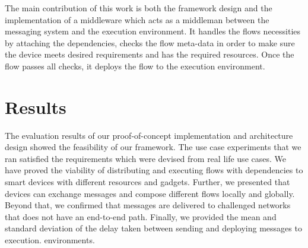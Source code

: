 \noindent The main contribution of this work is both the framework design and the implementation of a middleware which acts as a middleman between the messaging system and the execution environment. It handles the flows necessities by attaching the dependencies, checks the flow meta-data in order to make sure the device meets desired requirements and has the required resources. Once the flow passes all checks, it deploys the flow to the execution environment.


\section{Results}
The evaluation results of our  proof-of-concept implementation and architecture design showed the feasibility of our framework. The use case experiments that we ran satisfied the  requirements which were devised from  real life use cases. We have proved the viability of distributing and executing flows with dependencies to smart devices with different resources and gadgets. Further, we presented that devices can exchange messages and compose different flows locally and globally. Beyond that, we confirmed that messages are delivered to challenged networks that does not have an end-to-end path. Finally, we provided the mean and standard deviation of the delay taken between sending and deploying messages to execution. environments. 



